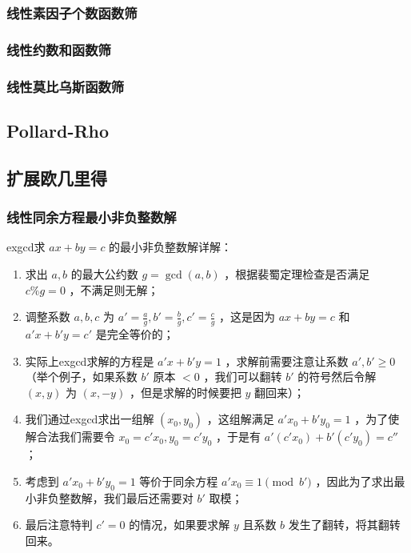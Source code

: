\documentclass{article}
\begin{document}
\subsubsection{线性素因子个数函数筛}

\subsubsection{线性约数和函数筛}

\subsubsection{线性莫比乌斯函数筛}

\subsection{Pollard-Rho}

\subsection{扩展欧几里得}
\subsubsection{线性同余方程最小非负整数解}
exgcd求 $ax+by=c$ 的最小非负整数解详解：
\begin{enumerate}
    \item 求出 $a,b$ 的最大公约数 $g=\gcd(a,b)$ ，根据裴蜀定理检查是否满足 $c\% g=0$ ，不满足则无解；
    \item 调整系数 $a,b,c$ 为 $a'=\frac{a}{g},b'=\frac{b}{g},c'=\frac{c}{g}$ ，这是因为 $ax+by=c$ 和 $a'x+b'y=c'$ 是完全等价的；
    \item 实际上exgcd求解的方程是 $a'x+b'y=1$ ，求解前需要注意让系数 $a',b'\geq 0$ （举个例子，如果系数 $b'$ 原本 $<0$ ，我们可以翻转 $b'$ 的符号然后令解 $(x,y)$ 为 $(x,-y)$ ，但是求解的时候要把 $y$ 翻回来）；
    \item 我们通过exgcd求出一组解 $(x_0,y_0)$ ，这组解满足 $a'x_0+b'y_0=1$ ，为了使解合法我们需要令 $x_0=c'x_0,y_0=c'y_0$ ，于是有 $a'(c'x_0)+b'(c'y_0)=c''$ ；
    \item 考虑到 $a'x_0+b'y_0=1$ 等价于同余方程 $a'x_0\equiv 1\pmod{b'}$ ，因此为了求出最小非负整数解，我们最后还需要对 $b'$ 取模；
    \item 最后注意特判 $c'=0$ 的情况，如果要求解 $y$ 且系数 $b$ 发生了翻转，将其翻转回来。
\end{enumerate}

\end{document}
